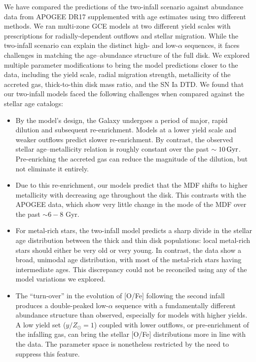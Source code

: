 \documentclass[twocolumn,twocolappendix,linenumbers]{aastex631}
\newcommand{\yZ}[1]{$y/Z_\odot=#1$}
\newcommand{\Gyr}{\,{\rm Gyr}}
\begin{document}
We have compared the predictions of the two-infall scenario against abundance data from APOGEE DR17 supplemented with age estimates using two different methods. We ran multi-zone GCE models at two different yield scales with prescriptions for radially-dependent outflows and stellar migration. While the two-infall scenario can explain the distinct high- and low-$\alpha$ sequences, it faces challenges in matching the age--abundance structure of the full disk. We explored multiple parameter modifications to bring the model predictions closer to the data, including the yield scale, radial migration strength, metallicity of the accreted gas, thick-to-thin disk mass ratio, and the SN Ia DTD. We found that our two-infall models faced the following challenges when compared against the stellar age catalogs:

\begin{itemize}
    \item By the model's design, the Galaxy undergoes a period of major, rapid dilution and subsequent re-enrichment. Models at a lower yield scale and weaker outflows predict slower re-enrichment. By contrast, the observed stellar age--metallicity relation is roughly constant over the past $\sim10\Gyr$. Pre-enriching the accreted gas can reduce the magnitude of the dilution, but not eliminate it entirely.
    \item Due to this re-enrichment, our models predict that the MDF shifts to higher metallicity with decreasing age throughout the disk. This contrasts with the APOGEE data, which show very little change in the mode of the MDF over the past $\sim6-8$ Gyr.
    \item For metal-rich stars, the two-infall model predicts a sharp divide in the stellar age distribution between the thick and thin disk populations: local metal-rich stars should either be very old or very young. In contrast, the data show a broad, unimodal age distribution, with most of the metal-rich stars having intermediate ages. This discrepancy could not be reconciled using any of the model variations we explored.
    \item The ``turn-over'' in the evolution of [O/Fe] following the second infall produces a double-peaked low-$\alpha$ sequence with a fundamentally different abundance structure than observed, especially for models with higher yields. A low yield set (\yZ{1}) coupled with lower outflows, or pre-enrichment of the infalling gas, can bring the stellar [O/Fe] distributions more in line with the data. The parameter space is nonetheless restricted by the need to suppress this feature.
\end{itemize}
\end{document}
